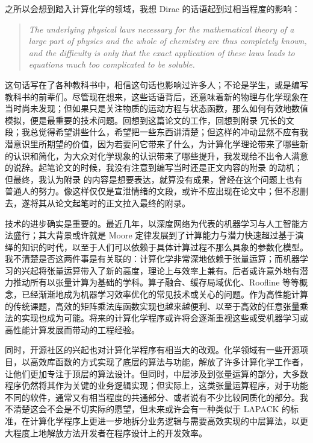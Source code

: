 之所以会想到踏入计算化学的领域，我想 Dirac 的话语起到过相当程度的影响\cite{Dirac-Dirac.PRSLA.1929}：
\begin{quotation}
    \it
    The underlying physical laws necessary for the mathematical theory of a large part of physics and the whole of chemistry are thus completely known, and the difficulty is only that the exact application of these laws leads to equations much too complicated to be soluble.
\end{quotation}
这句话写在了各种教科书中，相信这句话也影响过许多人；不论是学生，或是编写教科书的前辈们。尽管现在想来，这些话语背后，还意味着新的物理与化学现象在当时尚未发现；但如果只是关注物质的运动方程与状态函数，那么如何有效地数值模拟，便是最重要的技术问题。回想到这篇论文的工作，回想到附录  冗长的文段；我总觉得希望讲些什么，希望把一些东西讲清楚；但这样的冲动显然不应有我潜意识里所期望的价值，因为若要问它带来了什么，为计算化学理论带来了哪些新的认识和简化，为大众对化学现象的认识带来了哪些提升，我发现给不出令人满意的说辞。起笔论文的时候，我没有注意到编写当时还是正文内容的附录  的动机；但最终，我认为附录  的内容是想要表达，就算没有成果，曾经在这个问题上也有普通人的努力。像这样仅仅是宣泄情绪的文段，或许不应出现在论文中；但不忍删去，遂将其从论文起笔时的正文拉入最终的附录。

技术的进步确实是重要的。最近几年，以深度网络为代表的机器学习与人工智能方法盛行；其大背景或许就是 Moore 定律发展到了计算能力与潜力快速超过基于演绎的知识的时代，以至于人们可以依赖于具体计算过程不那么具象的参数化模型。我不清楚是否这两件事是有关联的：计算化学非常深地依赖于张量运算；而机器学习的兴起将张量运算带入了新的高度，理论上与效率上兼有。后者或许意外地有潜力推动所有以张量计算为基础的学科。算子融合、缓存局域优化、Roofline 等等概念，已经渐渐地成为机器学习效率优化的常见技术或关心的问题。作为高性能计算的传统课题，高效的矩阵乘法库函数实现也越来越便利\cite{vanZee-vandeGeijn.ATMS.2015}、以至于高效的任意张量乘法的实现也成为可能\cite{Matthews-Matthews.SJSC.2018}。将来的计算化学程序或许将会逐渐重视这些或受机器学习或高性能计算发展而带动的工程经验。

同时，开源社区的兴起也对计算化学程序有相当大的改观。化学领域有一些开源项目，以高效库函数的方式实现了底层的算法与功能\cite{Valeyev.libint, Lehtola-Marques.S.2018, Sun-Sun.JCC.2015}，解放了许多计算化学工作者，让他们更加专注于顶层的算法设计。但同时，中层涉及到张量运算的部分，大多数程序仍然将其作为关键的业务逻辑实现；但实际上，这类张量运算程序，对于功能不同的软件，通常又有相当程度的共通部分、或者说有不少比较同质化的部分。我不清楚这会不会是不切实际的愿望，但未来或许会有一种类似于 LAPACK 的标准，在计算化学程序上更进一步地拆分业务逻辑与需要高效实现的中层算法，以更大程度上地解放方法开发者在程序设计上的开发效率。

